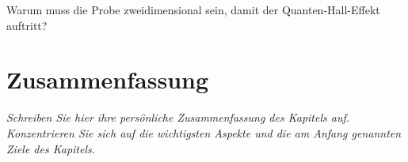 \begin{questions}
   \item Warum muss die Probe zweidimensional sein, damit der Quanten-Hall-Effekt auftritt?
\end{questions}



\newpage

\section{Zusammenfassung}

\textit{Schreiben Sie hier ihre persönliche Zusammenfassung des Kapitels auf. Konzentrieren Sie sich auf die wichtigsten Aspekte und die am Anfang genannten Ziele des Kapitels.}

\vspace*{10cm}
\printbibliography[segment=\therefsegment,heading=subbibliography]
